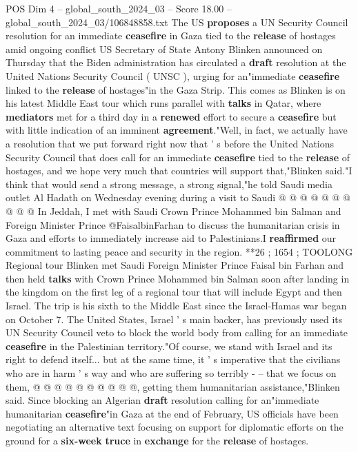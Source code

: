 \begin{textsample}{POS Dim 4 – global\_south\_2024\_03 – Score 18.00 – global\_south\_2024\_03/106848858.txt}  \label{ex:f4_pos_109}
The US \textbf{proposes} a UN Security Council resolution for an immediate \textbf{ceasefire} in Gaza tied to the \textbf{release} of hostages amid ongoing conflict US Secretary of State Antony Blinken announced on Thursday that the Biden administration has circulated a \textbf{draft} resolution at the United Nations Security Council ( UNSC ), urging for an"immediate \textbf{ceasefire} linked to the \textbf{release} of hostages"in the Gaza Strip.
This comes as Blinken is on his latest Middle East tour which runs parallel with \textbf{talks} in Qatar, where \textbf{mediators} met for a third day in a \textbf{renewed} effort to secure a \textbf{ceasefire} but with little indication of an imminent \textbf{agreement}."Well, in fact, we actually have a resolution that we put forward right now that ' s before the United Nations Security Council that does call for an immediate \textbf{ceasefire} tied to the \textbf{release} of hostages, and we hope very much that countries will support that,"Blinken said."I think that would send a strong message, a strong signal,"he told Saudi media outlet Al Hadath on Wednesday evening during a visit to Saudi @ @ @ @ @ @ @ @ @ @ In Jeddah, I met with Saudi Crown Prince Mohammed bin Salman and Foreign Minister Prince @FaisalbinFarhan to discuss the humanitarian crisis in Gaza and efforts to immediately increase aid to Palestinians.I \textbf{reaffirmed} our commitment to lasting peace and security in the region. **26 ; 1654 ; TOOLONG Regional tour Blinken met Saudi Foreign Minister Prince Faisal bin Farhan and then held \textbf{talks} with Crown Prince Mohammed bin Salman soon after landing in the kingdom on the first leg of a regional tour that will include Egypt and then Israel.
The trip is his sixth to the Middle East since the Israel-Hamas war began on October 7.
The United States, Israel ' s main backer, has previously used its UN Security Council veto to block the world body from calling for an immediate \textbf{ceasefire} in the Palestinian territory."Of course, we stand with Israel and its right to defend itself... but at the same time, it ' s imperative that the civilians who are in harm ' s way and who are suffering so terribly - -- that we focus on them, @ @ @ @ @ @ @ @ @ @, getting them humanitarian assistance,"Blinken said.
Since blocking an Algerian \textbf{draft} resolution calling for an"immediate humanitarian \textbf{ceasefire}"in Gaza at the end of February, US officials have been negotiating an alternative text focusing on support for diplomatic efforts on the ground for a \textbf{six-week} \textbf{truce} in \textbf{exchange} for the \textbf{release} of hostages.

\end{textsample}
